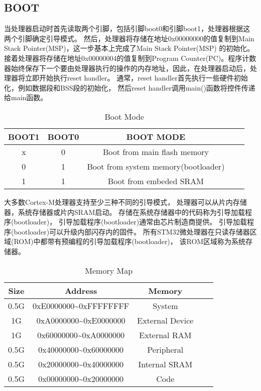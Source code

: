 \subsection{BOOT}
当处理器启动时首先读取两个引脚，包括引脚boot0和引脚boot1，处理器根据这两个引脚确定引导模式。
然后，处理器将存储在地址0x00000000的值复制到Main Stack Pointer(MSP)，这一步基本上完成了Main Stack Pointer(MSP) 的初始化。
接着处理器将存储在地址0x00000004的值复制到Program Counter(PC)。程序计数器始终保存下一个要由处理器执行的操作的内存地址，因此，在处理器启动后，处理器将立即开始执行reset handler。
通常，reset handler首先执行一些硬件初始化，例如数据段和BSS段的初始化， 然后reset handler调用main()函数将控件传递给main函数。
\begin{table}[htbp]
    \caption{ Boot Mode }\label{tab:table1}
    \vspace{0.5em}\centering\wuhao
    \begin{tabular}{ccccc}
    \toprule[1.5pt]
    BOOT1 & BOOT0 & BOOT MODE \\
    \midrule[1pt]
    x & 0 & Boot from main flash memory \\
    0 & 1 & Boot from system  memory(bootloader) \\
    1 & 1 & Boot from embeded SRAM  \\
    \bottomrule[1.5pt]
    \end{tabular}
    \vspace{\baselineskip}
    \end{table}

大多数Cortex-M处理器支持至少三种不同的引导模式，
处理器可以从片内存储器，系统存储器或片内SRAM启动。
存储在系统存储器中的代码称为引导加载程序(bootloader)，
引导加载程序(bootloader)通常由芯片制造商提供。
引导加载程序(bootloader)可以升级内部闪存内的固件。
所有STM32微处理器在只读存储器区域(ROM)中都带有预编程的引导加载程序(bootloader)，
该ROM区域称为系统存储器。
\begin{table}[tb]
    \caption{ Memory Map }\label{tab:table1}
    \vspace{0.5em}\centering\wuhao
    \begin{tabular}{ccccc}
    \toprule[1.5pt]
    Size & Address & Memory \\
    \midrule[1pt]
    0.5G & 0xE0000000\textasciitilde0xFFFFFFFF & System \\
    1G    & 0xA0000000\textasciitilde0xE0000000 & External Device \\
    1G    & 0x60000000\textasciitilde0xA0000000 & External RAM \\
    0.5G & 0x40000000\textasciitilde0x60000000 & Peripheral \\
    0.5G & 0x20000000\textasciitilde0x40000000 & Internal SRAM \\
    0.5G & 0x00000000\textasciitilde0x20000000 & Code \\
  
    \bottomrule[1.5pt]
    \end{tabular}
    \vspace{\baselineskip}
    \end{table}

